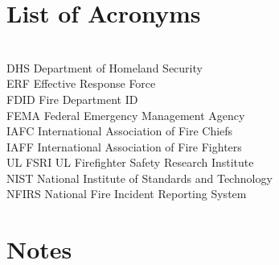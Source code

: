 \documentclass[12pt,oneside]{book}
\begin{document}
\chapter{List of Acronyms}

\begin{tabbing}
\hspace{1.5in} \= \\

DHS \> Department of Homeland Security \\
ERF \> Effective Response Force \\
FDID \> Fire Department ID \\
FEMA \> Federal Emergency Management Agency \\
IAFC \> International Association of Fire Chiefs \\
IAFF \> International Association of Fire Fighters \\
UL FSRI \> UL Firefighter Safety Research Institute \\
NIST \> National Institute of Standards and Technology  \\
NFIRS \> National Fire Incident Reporting System \\
\end{tabbing}



\chapter*{Notes}
\end{document}
